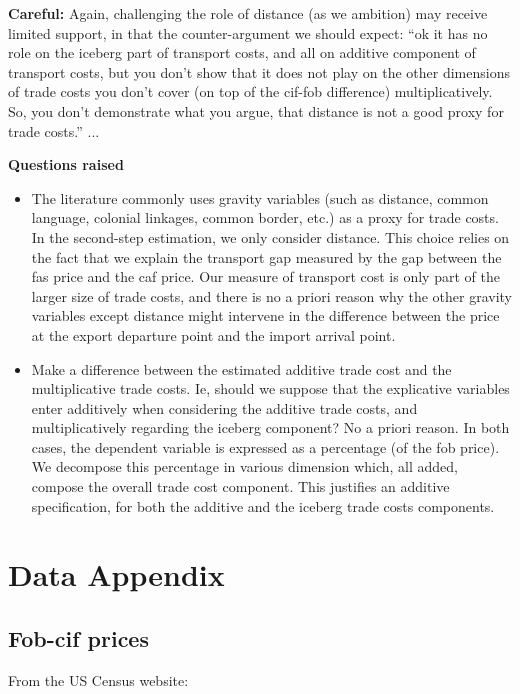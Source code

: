 \documentclass[a4paper,11pt]{article}
\begin{document}
\textbf{Careful:} Again, challenging the role of distance (as we ambition) may receive limited support, in that the counter-argument we should expect: ``ok it has no role on the iceberg part of transport costs, and all on additive component of transport costs, but you don't show that it does not play on the other dimensions of trade costs you don't cover (on top of the cif-fob difference) multiplicatively. So, you don't demonstrate what you argue, that distance is not a good proxy for trade costs.'' ... \bigskip



\textbf{Questions raised} \medskip
\begin{itemize}
\item The literature commonly uses gravity variables (such as distance, common language, colonial linkages, common border, etc.) as a proxy for trade costs. In the second-step estimation, we only consider distance. This choice relies on the fact that we explain the transport gap measured by the gap between the fas price and the caf price. Our measure of transport cost is only part of the larger size of trade costs, and there is no a priori reason why the other gravity variables except distance might intervene in the difference between the price at the export departure point and the import arrival point.

\item Make a difference between the estimated additive trade cost and the multiplicative trade costs. Ie, should we suppose that the explicative variables enter additively when considering the additive trade costs, and multiplicatively regarding the iceberg component? No a priori reason. In both cases, the dependent variable is expressed as a percentage (of the fob price). We decompose this percentage in various dimension which, all added, compose the overall trade cost component. This justifies an additive specification, for both the additive and the iceberg trade costs components.


\end{itemize}






\appendix

\section{Data Appendix \label{app:data}}

\subsection{Fob-cif prices}
From the US Census website:
\end{document}
